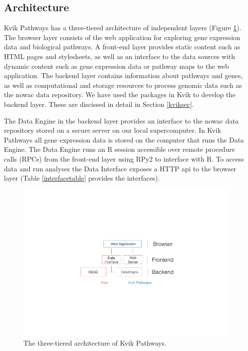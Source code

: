 \subsection{Architecture} 
Kvik Pathways has a three-tiered architecture of independent layers (Figure
\ref{fig:arch}). The browser layer consists of the web application for
exploring gene expression data and biological pathways. A front-end layer
provides static content such as HTML pages and stylesheets, as well as an
interface to the data sources with dynamic content such as gene expression
data or pathway maps to the web application. The backend layer contains
information about pathways and genes, as well as computational and storage
resources to process genomic data such as the \gls{nowac}  data repository. We
have used the packages in Kvik to develop the backend layer. These are discissed
in detail in Section \ref{kviksec}. 

The Data Engine in the backend layer provides an interface to the \gls{nowac}
data repository stored on a secure server on our local supercomputer. In Kvik
Pathways all gene expression data is stored on the computer that runs the Data
Engine. The Data Engine runs an R session accessible over remote procedure calls
(RPCs) from the front-end layer using RPy2\cite{rpy2} to interface with R. To
access data and run analyses the Data Interface exposes a HTTP \gls{api} to the
browser layer (Table \ref{interfacetable} provides the interfaces).

\begin{figure}[htb]
    \begin{centering}
    \includegraphics[width=\textwidth]{figures/archv2-name-fix.pdf}
    \caption{The three-tiered architecture of Kvik Pathways.} 
    \label{fig:arch}
    \end{centering} 
\end{figure}   

